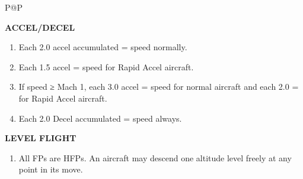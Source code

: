 
\begin{twocolumntablefloat}
    \begin{twocolumntable}

        \newcommand{\heading}[1]{\medskip\par\textbf{\MakeUppercase{#1}}\par\smallskip}
        \newcommand{\subheading}[1]{\smallskip\par\textbf{#1}\par\smallskip}

        \footnotesize
        \begin{tabularx}{\linewidth}{P@{\hspace{1em}}P}
            \toprule

            \heading{Accel/Decel}
            \begin{enumerate}[nosep]
                \item Each 2.0 accel accumulated =  speed normally.
                \item Each 1.5 accel =  speed for Rapid Accel aircraft.
                \item If speed ≥ Mach 1, each 3.0 accel =  speed for normal aircraft and each 2.0 =  for Rapid Accel aircraft.
                \item Each 2.0 Decel accumulated =  speed always.
            \end{enumerate}

            \heading{Level Flight}
            \begin{enumerate}[nosep]
                \item All FPs are HFPs. An aircraft may descend one altitude level freely at any point in its move.
            \end{enumerate}


\end{tabularx}
\end{twocolumntable}
\end{twocolumntablefloat}
